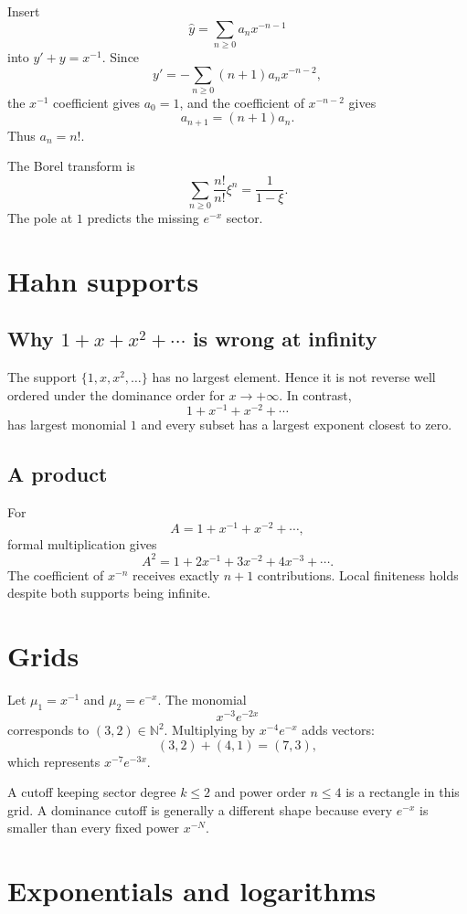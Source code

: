 \documentclass[11pt,openany]{book}
\theoremstyle{definition}
\theoremstyle{plain}
\theoremstyle{remark}
\newcommand{\N}{\mathbb{N}}
\newcommand{\trans}[1]{\widehat{#1}}
\begin{document}
Insert
\[
 \trans y=\sum_{n\ge0}a_nx^{-n-1}
\]
into $y'+y=x^{-1}$. Since
\[
 y'=-\sum_{n\ge0}(n+1)a_nx^{-n-2},
\]
the $x^{-1}$ coefficient gives $a_0=1$, and the coefficient of $x^{-n-2}$ gives
\[
 a_{n+1}=(n+1)a_n.
\]
Thus $a_n=n!$.

The Borel transform is
\[
 \sum_{n\ge0}\frac{n!}{n!}\xi^n=\frac1{1-\xi}.
\]
The pole at $1$ predicts the missing $e^{-x}$ sector.

\section{Hahn supports}

\subsection*{Why \texorpdfstring{$1+x+x^2+\cdots$}{1+x+x^2+...} is wrong at infinity}

The support $\{1,x,x^2,\dots\}$ has no largest element. Hence it is not reverse well ordered under the dominance order for $x\to+\infty$. In contrast,
\[
 1+x^{-1}+x^{-2}+\cdots
\]
has largest monomial $1$ and every subset has a largest exponent closest to zero.

\subsection*{A product}

For
\[
 A=1+x^{-1}+x^{-2}+\cdots,
\]
formal multiplication gives
\[
 A^2=1+2x^{-1}+3x^{-2}+4x^{-3}+\cdots.
\]
The coefficient of $x^{-n}$ receives exactly $n+1$ contributions. Local finiteness holds despite both supports being infinite.

\section{Grids}

Let $\mu_1=x^{-1}$ and $\mu_2=e^{-x}$. The monomial
\[
 x^{-3}e^{-2x}
\]
corresponds to $(3,2)\in\N^2$. Multiplying by $x^{-4}e^{-x}$ adds vectors:
\[
 (3,2)+(4,1)=(7,3),
\]
which represents $x^{-7}e^{-3x}$.

A cutoff keeping sector degree $k\le2$ and power order $n\le4$ is a rectangle in this grid. A dominance cutoff is generally a different shape because every $e^{-x}$ is smaller than every fixed power $x^{-N}$.

\section{Exponentials and logarithms}
\end{document}
